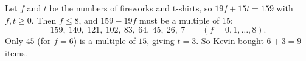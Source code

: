 Let $f$ and $t$ be the numbers of fireworks and t-shirts, so $19f+15t=159$ with $f,t\ge0$. Then $f\le8$, and $159-19f$ must be a multiple of $15$:
\[159,\ 140,\ 121,\ 102,\ 83,\ 64,\ 45,\ 26,\ 7\qquad(f=0,1,\ldots,8).\]
Only $45$ (for $f=6$) is a multiple of $15$, giving $t=3$. So Kevin bought $6+3=\boxed{9}$ items.
